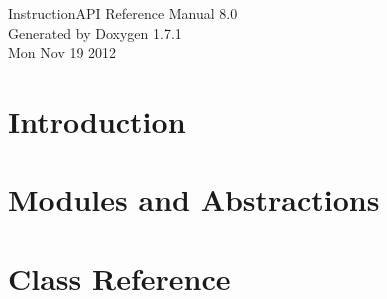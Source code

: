 \documentclass[a4paper]{article}
\begin{document}
\begin{titlepage}
\vspace*{7cm}
\begin{center}
{\Large InstructionAPI Reference Manual 8.0}\\
\vspace*{1cm}
{\large Generated by Doxygen 1.7.1}\\
\vspace*{0.5cm}
{\small Mon Nov 19 2012}\\
\end{center}
\end{titlepage}
\clearemptydoublepage
{}
\tableofcontents
\clearemptydoublepage
{}
\section{Introduction}
\label{index}
\section{Modules and Abstractions}




\section{Class Reference}













\printindex
\end{document}
